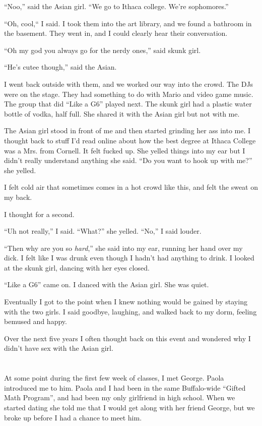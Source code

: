 ``Noo,'' said the Asian girl.  ``We go to Ithaca college.  We're sophomores.''

``Oh, cool,`` I said.   I took them into the art library, and we found a
bathroom in the basement.  They went in, and I could clearly hear their
conversation.

``Oh my god you always go for the nerdy ones,'' said skunk girl.

``He's cutee though,'' said the Asian. 

I went back outside with them, and we worked our way into the crowd.  The DJs
were on the stage.  They had something to do with Mario and video game music.
The group that did ``Like a G6'' played next.  The skunk girl had a plastic
water bottle of vodka, half full.  She shared it with the Asian girl but not
with me.

The Asian girl stood in front of me and then started grinding her ass into me.
I thought back to stuff I'd read online about how the best degree at Ithaca
College was a Mrs. from Cornell.  It felt fucked up.  She yelled things into my
ear but I didn't really understand anything she said.  ``Do you want to hook up
with me?'' she yelled.  

I felt cold air that sometimes comes in a hot crowd like this, and felt the
sweat on my back.

I thought for a second.

``Uh not really,'' I said.  ``What?'' she yelled.  ``No,'' I said louder.

``Then why are you so \textit{hard},'' she said into my ear, running her hand
over my dick.  I felt like I was drunk even though I hadn't had anything to
drink.  I looked at the skunk girl, dancing with her eyes closed.

``Like a G6'' came on.  I danced with the Asian girl.  She was quiet.

Eventually I got to the point when I knew nothing would be gained by staying
with the two girls.  I said goodbye, laughing, and walked back to my dorm,
feeling bemused and happy. 

Over the next five years I often thought back on this event and wondered why I
didn't have sex with the Asian girl.  

\section{}

At some point during the first few week of classes, I met George.  Paola
introduced me to him.  Paola and I had been in the same Buffalo-wide ``Gifted
Math Program'', and had been my only girlfriend in high school.  When we
started dating she told me that I would get along with her friend George, but
we broke up before I had a chance to meet him. 

